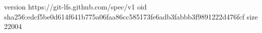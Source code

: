 version https://git-lfs.github.com/spec/v1
oid sha256:edcf5be0d614f641b775a06faa86cc585173fe6adb3fabbb3f9891222d476fcf
size 22004
